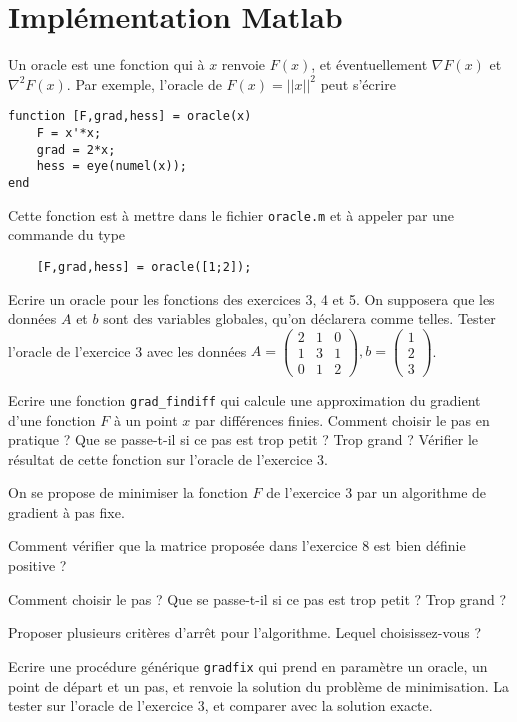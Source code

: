 \documentclass[12pt,a4paper,fleqn]{report}
\begin{document}
\section{Implémentation Matlab}
\begin{exercice}
  Un oracle est une fonction qui à $x$ renvoie $F(x)$, et
  éventuellement $\nabla F(x)$ et $\nabla^{2} F(x)$. Par exemple,
  l'oracle de $F(x) = ||x||^{2}$ peut s'écrire
\begin{verbatim}
function [F,grad,hess] = oracle(x)
    F = x'*x;
    grad = 2*x;
    hess = eye(numel(x));
end
\end{verbatim}

Cette fonction est à mettre dans le fichier \verb+oracle.m+ et à
appeler par une commande du type
\begin{verbatim}
    [F,grad,hess] = oracle([1;2]);
\end{verbatim}

Ecrire un oracle pour les fonctions des exercices 3, 4 et 5. On
supposera que les données $A$ et $b$ sont des variables globales,
qu'on déclarera comme telles. Tester l'oracle de l'exercice 3 avec les
données $A = \begin{pmatrix}2&1&0\\1&3&1\\0&1&2\end{pmatrix}, b
= \begin{pmatrix}1\\2\\3\end{pmatrix}$.
\end{exercice}

\begin{exercice}
  Ecrire une fonction \verb+grad_findiff+ qui calcule une
  approximation du gradient d'une fonction $F$ à un point $x$ par
  différences finies. Comment choisir le pas en pratique ? Que se
  passe-t-il si ce pas est trop petit ? Trop grand ? Vérifier le
  résultat de cette fonction sur l'oracle de l'exercice 3.
\end{exercice}

\begin{exercice}
  On se propose de minimiser la fonction $F$ de l'exercice 3 par un
  algorithme de gradient à pas fixe.
  \begin{questions}
  \item Comment vérifier que la matrice proposée dans l'exercice 8 est
    bien définie positive ?
  \item Comment choisir le pas ? Que se passe-t-il si ce pas est trop
    petit ? Trop grand ?
  \item Proposer plusieurs critères d'arrêt pour l'algorithme. Lequel
    choisissez-vous ?
  \item Ecrire une procédure générique \verb+gradfix+ qui prend en
    paramètre un oracle, un point de départ et un pas, et renvoie la
    solution du problème de minimisation. La tester sur l'oracle de
    l'exercice 3, et comparer avec la solution exacte.
  \end{questions}

\end{exercice}
\end{document}
